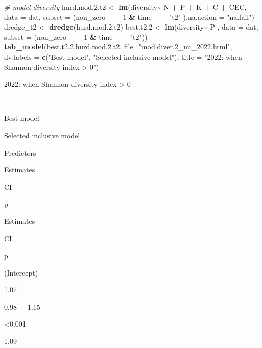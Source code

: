 \documentclass[
]{article}
\newenvironment{Shaded}{\begin{snugshade}}{\end{snugshade}}
\newcommand{\AttributeTok}[1]{\textcolor[rgb]{0.13,0.29,0.53}{#1}}
\newcommand{\CommentTok}[1]{\textcolor[rgb]{0.56,0.35,0.01}{\textit{#1}}}
\newcommand{\DecValTok}[1]{\textcolor[rgb]{0.00,0.00,0.81}{#1}}
\newcommand{\FloatTok}[1]{\textcolor[rgb]{0.00,0.00,0.81}{#1}}
\newcommand{\FunctionTok}[1]{\textcolor[rgb]{0.13,0.29,0.53}{\textbf{#1}}}
\newcommand{\NormalTok}[1]{#1}
\newcommand{\OtherTok}[1]{\textcolor[rgb]{0.56,0.35,0.01}{#1}}
\newcommand{\SpecialCharTok}[1]{\textcolor[rgb]{0.81,0.36,0.00}{\textbf{#1}}}
\newcommand{\StringTok}[1]{\textcolor[rgb]{0.31,0.60,0.02}{#1}}
\begin{document}
\begin{Shaded}
\begin{Highlighting}[]
\CommentTok{\# model diversity}
\NormalTok{hurd.mod.}\FloatTok{2.}\NormalTok{t2 }\OtherTok{\textless{}{-}} \FunctionTok{lm}\NormalTok{(diversity}\SpecialCharTok{\textasciitilde{}}\NormalTok{ N }\SpecialCharTok{+}\NormalTok{ P }\SpecialCharTok{+}\NormalTok{ K }\SpecialCharTok{+}\NormalTok{ C }\SpecialCharTok{+}\NormalTok{ CEC, }\AttributeTok{data =}\NormalTok{ dat, }\AttributeTok{subset =}\NormalTok{ (non\_zero }\SpecialCharTok{==} \DecValTok{1} \SpecialCharTok{\&}\NormalTok{ time }\SpecialCharTok{==} \StringTok{"t2"}\NormalTok{ ),}\AttributeTok{na.action =} \StringTok{"na.fail"}\NormalTok{)}
\NormalTok{dredge\_t2 }\OtherTok{\textless{}{-}} \FunctionTok{dredge}\NormalTok{(hurd.mod.}\FloatTok{2.}\NormalTok{t2)}
\NormalTok{best.t2}\FloatTok{.2} \OtherTok{\textless{}{-}} \FunctionTok{lm}\NormalTok{(diversity}\SpecialCharTok{\textasciitilde{}}\NormalTok{  P , }\AttributeTok{data =}\NormalTok{ dat, }\AttributeTok{subset =}\NormalTok{ (non\_zero }\SpecialCharTok{==} \DecValTok{1} \SpecialCharTok{\&}\NormalTok{ time }\SpecialCharTok{==} \StringTok{"t2"}\NormalTok{))}
\FunctionTok{tab\_model}\NormalTok{(best.t2}\FloatTok{.2}\NormalTok{,hurd.mod.}\FloatTok{2.}\NormalTok{t2, }\AttributeTok{file=}\StringTok{"mod.diver.2\_nu\_2022.html"}\NormalTok{, }\AttributeTok{dv.labels =} \FunctionTok{c}\NormalTok{(}\StringTok{"Best model"}\NormalTok{, }\StringTok{"Selected inclusive model"}\NormalTok{), }\AttributeTok{title =} \StringTok{"2022: when Shannon diversity index \textgreater{} 0"}\NormalTok{)}
\end{Highlighting}
\end{Shaded}

2022: when Shannon diversity index \textgreater{} 0

~

Best model

Selected inclusive model

Predictors

Estimates

CI

p

Estimates

CI

p

(Intercept)

1.07

0.98~--~1.15

\textless0.001

1.09
\end{document}
